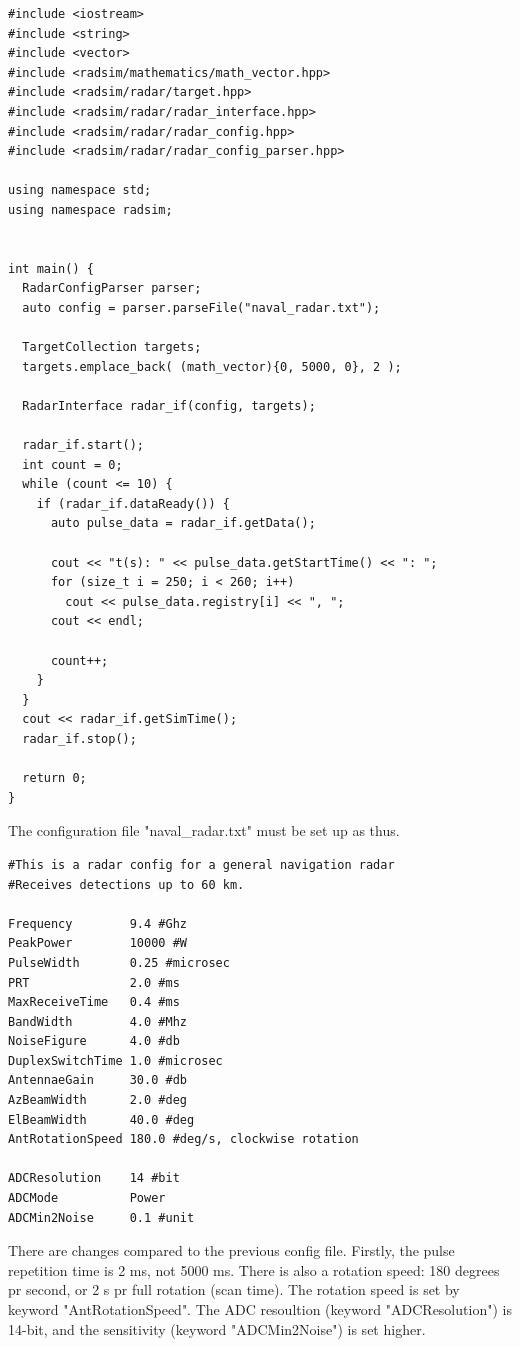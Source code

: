 \documentclass[letterpaper]{book}
\begin{document}
\begin{lstlisting}
#include <iostream>
#include <string>
#include <vector>
#include <radsim/mathematics/math_vector.hpp>
#include <radsim/radar/target.hpp>
#include <radsim/radar/radar_interface.hpp>
#include <radsim/radar/radar_config.hpp>
#include <radsim/radar/radar_config_parser.hpp>

using namespace std;
using namespace radsim;


int main() {
  RadarConfigParser parser;
  auto config = parser.parseFile("naval_radar.txt");

  TargetCollection targets;
  targets.emplace_back( (math_vector){0, 5000, 0}, 2 );

  RadarInterface radar_if(config, targets);

  radar_if.start();
  int count = 0;
  while (count <= 10) {
    if (radar_if.dataReady()) {
      auto pulse_data = radar_if.getData();

      cout << "t(s): " << pulse_data.getStartTime() << ": ";
      for (size_t i = 250; i < 260; i++)
        cout << pulse_data.registry[i] << ", ";
      cout << endl;

      count++;
    }      
  }
  cout << radar_if.getSimTime();
  radar_if.stop();

  return 0;
}
\end{lstlisting}
The configuration file "naval\_radar.txt" must be set up as thus. 
\begin{verbatim}
#This is a radar config for a general navigation radar
#Receives detections up to 60 km. 

Frequency        9.4 #Ghz
PeakPower        10000 #W
PulseWidth       0.25 #microsec
PRT              2.0 #ms
MaxReceiveTime   0.4 #ms
BandWidth        4.0 #Mhz
NoiseFigure      4.0 #db
DuplexSwitchTime 1.0 #microsec
AntennaeGain     30.0 #db
AzBeamWidth      2.0 #deg
ElBeamWidth      40.0 #deg
AntRotationSpeed 180.0 #deg/s, clockwise rotation

ADCResolution    14 #bit
ADCMode          Power
ADCMin2Noise     0.1 #unit
\end{verbatim}
There are changes compared to the previous config file. Firstly, the pulse repetition time is 2 ms, not 5000 ms. There is also a rotation speed: 180 degrees pr second, or 2 s pr full rotation (scan time). The rotation speed is set by keyword "AntRotationSpeed". 
The ADC resoultion (keyword "ADCResolution") is 14-bit, and the sensitivity (keyword "ADCMin2Noise") is set higher. 
\end{document}
